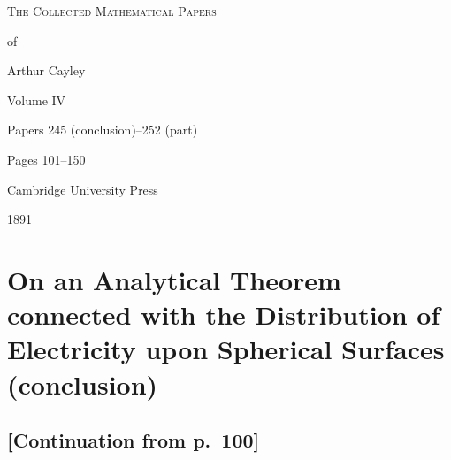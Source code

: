 \documentclass[11pt,a4paper]{article}
\begin{document}
\thispagestyle{empty}
\begin{center}
\vspace*{2cm}
{\Huge\scshape The Collected Mathematical Papers\par\vspace{0.3em} of\par\vspace{0.5em} Arthur Cayley\par\vspace{1.5em}}
{\LARGE Volume IV\par\vspace{1em}}
{\large Papers 245 (conclusion)--252 (part)\par\vspace{0.5em}}
{\large Pages 101--150\par\vspace{2em}}
\vfill
{\large Cambridge University Press\par\vspace{0.3em}}
{\normalsize 1891}
\end{center}
\newpage

\tableofcontents
\newpage

\setcounter{page}{101}


\section*{On an Analytical Theorem connected with the Distribution of Electricity upon Spherical Surfaces (conclusion)}
\label{paper:245}

\subsection*{[Continuation from p.~100]}
\end{document}
